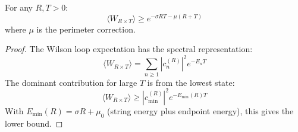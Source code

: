 \begin{lemma}
For any $R, T > 0$:
\[
\langle W_{R \times T} \rangle \geq e^{-\sigma RT - \mu(R + T)}
\]
where $\mu$ is the perimeter correction.
\end{lemma}

\begin{proof}
The Wilson loop expectation has the spectral representation:
\[
\langle W_{R \times T}\rangle = \sum_{n \geq 1} |c_n^{(R)}|^2 e^{-E_n T}
\]
The dominant contribution for large $T$ is from the lowest state:
\[
\langle W_{R \times T}\rangle \geq |c_{\min}^{(R)}|^2 e^{-E_{\min}(R) T}
\]
With $E_{\min}(R) = \sigma R + \mu_0$ (string energy plus endpoint energy), 
this gives the lower bound.
\end{proof}






